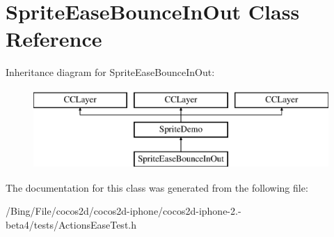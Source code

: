 \hypertarget{interface_sprite_ease_bounce_in_out}{\section{Sprite\-Ease\-Bounce\-In\-Out Class Reference}
\label{interface_sprite_ease_bounce_in_out}
}
Inheritance diagram for Sprite\-Ease\-Bounce\-In\-Out\-:\begin{figure}[H]
\begin{center}
\leavevmode
\includegraphics[height=3.000000cm]{interface_sprite_ease_bounce_in_out}
\end{center}
\end{figure}


The documentation for this class was generated from the following file\-:\begin{DoxyCompactItemize}
\item 
/\-Bing/\-File/cocos2d/cocos2d-\/iphone/cocos2d-\/iphone-\/2.-\/beta4/tests/Actions\-Ease\-Test.\-h\end{DoxyCompactItemize}
